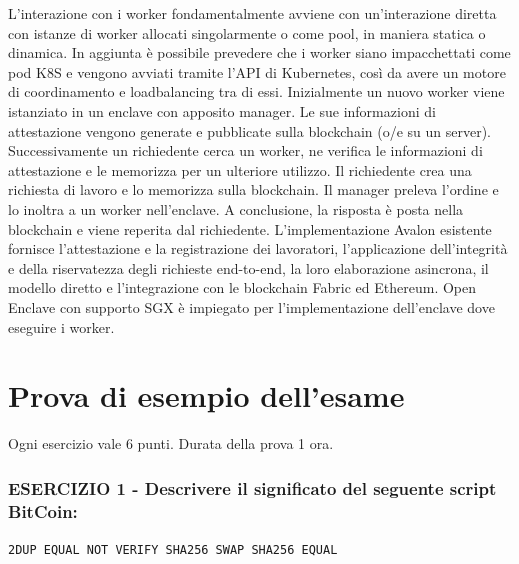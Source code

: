 L’interazione con i worker fondamentalmente avviene
con un'interazione diretta con istanze di worker allocati
singolarmente o come pool, in maniera statica o
dinamica.
In aggiunta è possibile prevedere che i worker siano
impacchettati come pod K8S e vengono avviati tramite
l'API di Kubernetes, così da avere un motore di
coordinamento e loadbalancing tra di essi. Inizialmente un nuovo worker viene istanziato in un enclave con
apposito manager. Le sue informazioni di attestazione vengono
generate e pubblicate sulla blockchain (o/e su un server). Successivamente un richiedente cerca un worker, ne verifica le
informazioni di attestazione e le memorizza per un ulteriore utilizzo. Il richiedente crea una richiesta di lavoro e lo memorizza sulla blockchain. Il manager preleva
l’ordine e lo inoltra a un
worker nell’enclave. A conclusione, la risposta
è posta nella blockchain
e viene reperita dal
richiedente. L'implementazione Avalon esistente fornisce l'attestazione e la
registrazione dei lavoratori, l'applicazione dell'integrità e della
riservatezza degli richieste end-to-end, la loro elaborazione
asincrona, il modello diretto e l'integrazione con le blockchain Fabric
ed Ethereum.
Open Enclave con
supporto SGX è
impiegato per
l’implementazione
dell’enclave dove
eseguire i worker.

\clearpage
\section{Prova di esempio dell'esame}
Ogni esercizio vale 6 punti. Durata della prova 1 ora.

\vspace{5mm}

\subsubsection{\textbf{ESERCIZIO 1} - Descrivere il significato del seguente script BitCoin:}

\begin{center}
    \texttt{2DUP EQUAL NOT VERIFY SHA256 SWAP SHA256 EQUAL}
\end{center}


